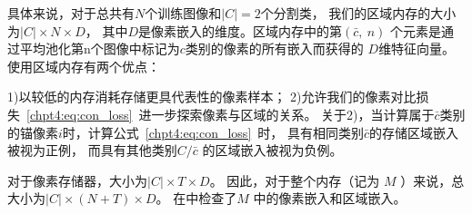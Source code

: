 具体来说，对于总共有$N$个训练图像和$|C|=2$个分割类，
我们的区域内存的大小为$|C|\times N \times D$，
其中$D$是像素嵌入的维度。区域内存中的第$(\bar{c},~n)$
个元素是通过平均池化第n个图像中标记为$c$类别的像素的所有嵌入而获得的
$D$维特征向量。
使用区域内存有两个优点：

1)以较低的内存消耗存储更具代表性的像素样本；
2)允许我们的像素对比损失~\ref{chpt4:eq:con_loss}~进一步探索像素与区域的关系。
关于2)，当计算属于$\bar{c}$类别的锚像素$i$时，计算公式~\ref{chpt4:eq:con_loss}~时，
具有相同类别$\bar{c}$的存储区域嵌入被视为正例，
而具有其他类别$C/ \bar{c}$ 的区域嵌入被视为负例。
% 
% 
% 
% 
\par
对于像素存储器，大小为$|C|\times T \times D$。
因此，对于整个内存（记为 $M$ ）来说，总大小为$|C| \times (N+T) \times D$。
在\todo 中检查了$M$ 中的像素嵌入和区域嵌入。









% 
% 
% 
% 







